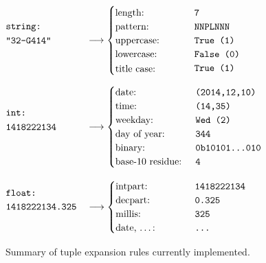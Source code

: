 \begin{figure}
  \newenvironment{stackedlines}{\renewcommand{\arraystretch}{1.2}\begin{array}[b]{@{}l@{\quad}l@{}}}{\end{array}}
  $\begin{stackedlines}
    \texttt{string:}\\
    \texttt{\parbox{\widthof{1418222134.325}}{"32-G414"}}
  \end{stackedlines} \longrightarrow
  \begin{cases}
    \text{length: } & \texttt{7}\\
    \text{pattern: } & \texttt{NNPLNNN}\\
    \text{uppercase: } & \texttt{True (1)}\\
    \text{lowercase: } & \texttt{False (0)}\\
    \text{\parbox{\widthof{base-10 residue:}}{title case:} } & \texttt{True (1)}
  \end{cases}$

  $\begin{stackedlines}
    \texttt{int:}\\
    \texttt{\parbox{\widthof{1418222134.325}}{1418222134}}
  \end{stackedlines} \longrightarrow
  \begin{cases}
    \text{date: } & \texttt{(2014,12,10)}\\
    \text{time: } & \texttt{(14,35)}\\
    \text{weekday: } & \texttt{Wed (2)}\\
    \text{day of year: } & \texttt{344}\\
    \text{binary: } & \texttt{0b10101\ldots010}\\
    \text{base-10 residue: } & \texttt{4}
  \end{cases}$

   $\begin{stackedlines}
    \texttt{float:}\\
    \texttt{1418222134.325}
  \end{stackedlines} \longrightarrow
  \begin{cases}
    \text{intpart: } & \texttt{1418222134}\\
    \text{decpart: } & \texttt{0.325}\\
    \text{millis: } & \texttt{325}\\
    \text{\parbox{\widthof{base-10 residue:}}{date, \ldots:} } & \texttt{\ldots}
  \end{cases}$

  \caption{Summary of tuple expansion rules currently implemented.}
  \label{fig:tuple-expansion}
\end{figure}
